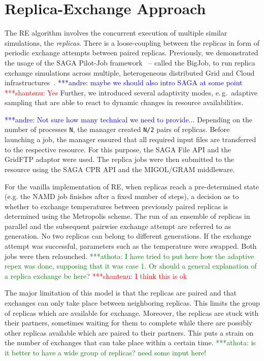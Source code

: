 \documentclass[a4paper,10pt]{article}
\newcommand{\jhanote}[1]{ {\textcolor{red} { ***shantenu: #1 }}}
\newcommand{\alnote}[1]{ {\textcolor{blue} { ***andre: #1 }}}
\newcommand{\athotanote}[1]{ {\textcolor{green} { ***athota: #1 }}}
\newcommand{\alnote}[1]{}
\newcommand{\jhanote}[1]{}
\newcommand{\athotanote}[1]{}
\begin{document}

\section{Replica-Exchange Approach}

The RE algorithm involves the concurrent execution of multiple similar
simulations, the \emph{replicas}.  There is a loose-coupling between
the replicas in form of periodic exchange attempts between paired
replicas. Previously, we demonstrated the usage of the SAGA Pilot-Job
framework~\cite{saga_bigjob_condor_cloud} -- called the BigJob, to run
replica exchange simulations across multiple, heterogeneous
distributed Grid and Cloud infrastructures~\cite{Luckow:2008fp}.
\alnote{maybe we should also intro SAGA at some point} \jhanote{Yes}
Further, we introduced several adaptivity modes, e.\,g.\ adaptive
sampling that are able to react to dynamic changes in resource
availabilities.

\alnote{Not sure how many technical we need to provide...}  Depending
on the number of processes \texttt{N}, the manager created \texttt{N/2} pairs
of replicas.  Before launching a job, the manager ensured that all
required input files are transferred to the respective resource. For
this purpose, the SAGA File API and the GridFTP adaptor were used. The
replica jobs were then submitted to the resource using the SAGA CPR
API and the MIGOL/GRAM middleware.

For the vanilla implementation of RE, when replicas reach a
pre-determined state (e.g. the NAMD job finishes after a fixed number
of steps), a decision as to whether to exchange temperatures between
previously paired replicas is determined using the Metropolis scheme.
The run of an ensemble of replicas in parallel and the subsequent
pairwise exchange attempt are referred to as generation. No two
replicas can belong to different generations. If the exchange attempt
was successful, parameters such as the temperature were swapped. Both
jobs were then relaunched.  \athotanote{I have tried to put here how
  the adaptive repex was done, supposing that it was case 1. Or should
  a general explanation of a replica exchange be here?} \jhanote{I
  think this is ok}
 
The major limitation of this model is that the replicas are paired and
that exchanges can only take place between neighboring replicas.  This
limits the group of replicas which are available for
exchange. Moreover, the replicas are stuck with their partners,
sometimes waiting for them to complete while there are possibly other
replicas available which are paired to their partners.  This puts a
strain on the number of exchanges that can take place within a certain
time.  \athotanote{is it better to have a wide group of replicas?
  need some input here!}
  
\end{document}
